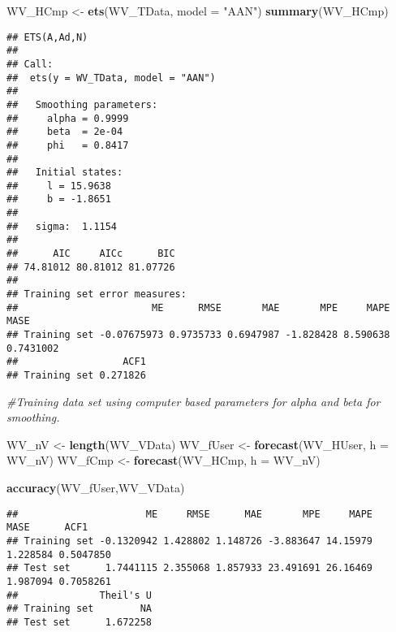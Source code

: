\documentclass[
]{article}
\newenvironment{Shaded}{\begin{snugshade}}{\end{snugshade}}
\newcommand{\CommentTok}[1]{\textcolor[rgb]{0.56,0.35,0.01}{\textit{#1}}}
\newcommand{\DataTypeTok}[1]{\textcolor[rgb]{0.13,0.29,0.53}{#1}}
\newcommand{\KeywordTok}[1]{\textcolor[rgb]{0.13,0.29,0.53}{\textbf{#1}}}
\newcommand{\NormalTok}[1]{#1}
\newcommand{\StringTok}[1]{\textcolor[rgb]{0.31,0.60,0.02}{#1}}
\begin{document}
\begin{Shaded}
\begin{Highlighting}[]
\NormalTok{WV_HCmp <-}\StringTok{ }\KeywordTok{ets}\NormalTok{(WV_TData, }\DataTypeTok{model =} \StringTok{"AAN"}\NormalTok{)}
\KeywordTok{summary}\NormalTok{(WV_HCmp)}
\end{Highlighting}
\end{Shaded}

\begin{verbatim}
## ETS(A,Ad,N) 
## 
## Call:
##  ets(y = WV_TData, model = "AAN") 
## 
##   Smoothing parameters:
##     alpha = 0.9999 
##     beta  = 2e-04 
##     phi   = 0.8417 
## 
##   Initial states:
##     l = 15.9638 
##     b = -1.8651 
## 
##   sigma:  1.1154
## 
##      AIC     AICc      BIC 
## 74.81012 80.81012 81.07726 
## 
## Training set error measures:
##                       ME      RMSE       MAE       MPE     MAPE      MASE
## Training set -0.07675973 0.9735733 0.6947987 -1.828428 8.590638 0.7431002
##                  ACF1
## Training set 0.271826
\end{verbatim}

\begin{Shaded}
\begin{Highlighting}[]
\CommentTok{#Training data set using computer based parameters for alpha and beta for smoothing.}
\end{Highlighting}
\end{Shaded}

\begin{Shaded}
\begin{Highlighting}[]
\NormalTok{WV_nV <-}\StringTok{ }\KeywordTok{length}\NormalTok{(WV_VData)}
\NormalTok{WV_fUser <-}\StringTok{ }\KeywordTok{forecast}\NormalTok{(WV_HUser, }\DataTypeTok{h =}\NormalTok{ WV_nV)}
\NormalTok{WV_fCmp <-}\StringTok{ }\KeywordTok{forecast}\NormalTok{(WV_HCmp, }\DataTypeTok{h =}\NormalTok{ WV_nV)}
\end{Highlighting}
\end{Shaded}

\begin{Shaded}
\begin{Highlighting}[]
\KeywordTok{accuracy}\NormalTok{(WV_fUser,WV_VData)}
\end{Highlighting}
\end{Shaded}

\begin{verbatim}
##                      ME     RMSE      MAE       MPE     MAPE     MASE      ACF1
## Training set -0.1320942 1.428802 1.148726 -3.883647 14.15979 1.228584 0.5047850
## Test set      1.7441115 2.355068 1.857933 23.491691 26.16469 1.987094 0.7058261
##              Theil's U
## Training set        NA
## Test set      1.672258
\end{verbatim}
\end{document}
